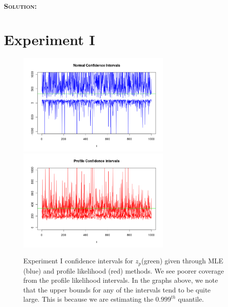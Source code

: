 \documentclass[12pt,oneside]{article}
\newenvironment{solution}
    {\textbf{\textsc{Solution:}}\\}
    {\newpage}
\begin{document}
\begin{solution}
\section*{Experiment I}
\begin{figure}[H]
\begin{center}
{\includegraphics[width=3in]{Assignments/a2/e1-nci.png}}
{\includegraphics[width=3in]{Assignments/a2/e1-pllci.png}}
\caption{Experiment I confidence intervals for $z_p$(green) given through MLE (blue) and profile likelihood (red) methods. We see poorer coverage from the profile likelihood intervals. In the graphs above, we note that the upper bounds for any of the intervals tend to be quite large. This is because we are estimating the $0.999^{th}$ quantile.}
\end{center}
\end{figure}
 

\end{solution}
\end{document}
